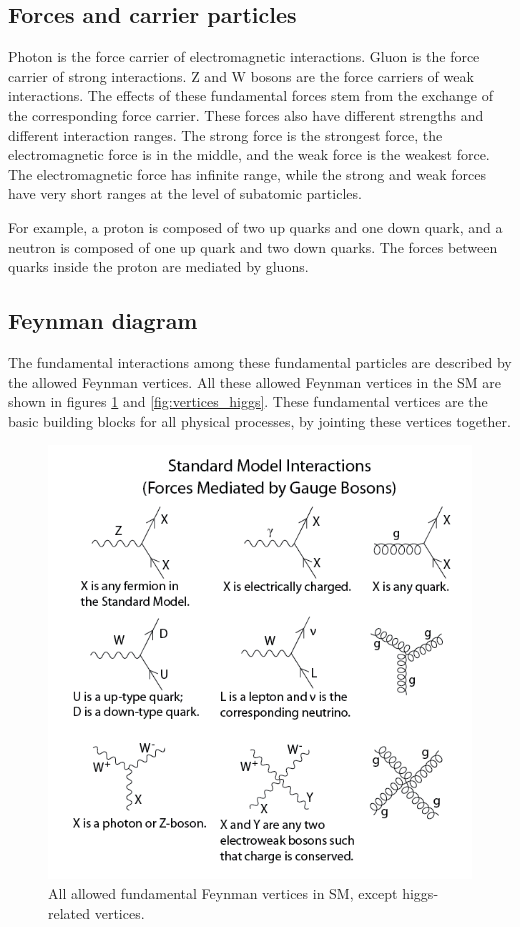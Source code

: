 \subsection{Forces and carrier particles}
Photon is the force carrier of electromagnetic interactions.
Gluon is the force carrier of strong interactions.
Z and W bosons are the force carriers of weak interactions.
The effects of these fundamental forces stem from the exchange of the corresponding force carrier.
These forces also have different strengths and different interaction ranges.
The strong force is the strongest force, the electromagnetic force is in the middle, and the weak force is the weakest force.
The electromagnetic force has infinite range, while the strong and weak forces have very short ranges at the level of subatomic particles.

For example, a proton is composed of two up quarks and one down quark, and a neutron is composed of one up quark and two down quarks.
The forces between quarks inside the proton are mediated by gluons.

\subsection{Feynman diagram}
The fundamental interactions among these fundamental particles are described by the allowed Feynman vertices.
All these allowed Feynman vertices in the SM are shown in figures \ref{fig:vertices_SM} and \ref{fig:vertices_higgs}.
These fundamental vertices are the basic building blocks for all physical processes, by jointing these vertices together.

\begin{figure}
\centering
\includegraphics[width=\textwidth]{data/photo/theory/vertices_SM.png}
\caption{All allowed fundamental Feynman vertices in SM, except higgs-related vertices. \cite{vertices_SM}}
\label{fig:vertices_SM}
\end{figure}


